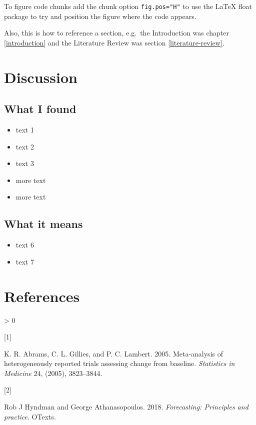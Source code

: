 \documentclass[
  openany]{book}
\providecommand{\tightlist}{%
  \setlength{\itemsep}{0pt}\setlength{\parskip}{0pt}}
\newlength{\cslhangindent}
\newlength{\csllabelwidth}
\newenvironment{CSLReferences}[2] %
 {%
  \setlength{\parindent}{0pt}
  \ifodd #1 \everypar{\setlength{\hangindent}{\cslhangindent}}\ignorespaces\fi
  \ifnum #2 > 0
  \setlength{\parskip}{#2\baselineskip}
  \fi
 }%
 {}
\newcommand{\CSLLeftMargin}[1]{\parbox[t]{\csllabelwidth}{#1}}
\newcommand{\CSLRightInline}[1]{\parbox[t]{\linewidth - \csllabelwidth}{#1}\break}
\begin{document}
To figure code chunks add the chunk option \texttt{fig.pos="H"} to use the LaTeX float package to try and position the figure where the code appears.

Also, this is how to reference a section, e.g.~the Introduction was chapter \ref{introduction} and the Literature Review was section \ref{literature-review}.

\hypertarget{discussion}{%
\chapter{Discussion}\label{discussion}}

\hypertarget{what-i-found}{%
\section{What I found}\label{what-i-found}}

\begin{itemize}
\tightlist
\item
  text 1
\item
  text 2
\item
  text 3
\item
  more text
\item
  more text
\end{itemize}

\hypertarget{what-it-means}{%
\section{What it means}\label{what-it-means}}

\begin{itemize}
\tightlist
\item
  text 6
\item
  text 7
\end{itemize}

\hypertarget{references}{%
\chapter{References}\label{references}}

\hypertarget{refs}{}
\begin{CSLReferences}{0}{0}
\leavevmode\hypertarget{ref-Abrams2005}{}%
\CSLLeftMargin{{[}1{]} }
\CSLRightInline{K. R. Abrams, C. L. Gillies, and P. C. Lambert. 2005. Meta-analysis of heterogeneously reported trials assessing change from baseline. \emph{Statistics in Medicine} 24, (2005), 3823--3844.}

\leavevmode\hypertarget{ref-hyndman2018forecasting}{}%
\CSLLeftMargin{{[}2{]} }
\CSLRightInline{Rob J Hyndman and George Athanasopoulos. 2018. \emph{Forecasting: Principles and practice}. OTexts.}

\end{CSLReferences}
\end{document}
